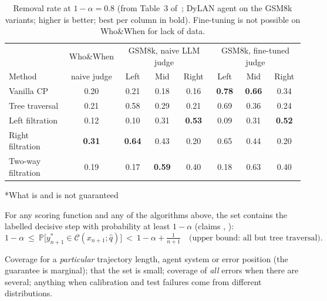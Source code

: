 \documentclass[11pt]{article}
\makeatletter
\theoremstyle{definition}
\renewcommand\subsection{\@startsection{subsection}{2}{\z@}{-3.25ex\@plus -1ex \@minus -.2ex}{1.5ex \@plus .2ex}{\normalfont\large\bfseries\color{secblue}}}
\newcommand{\C}{\mathcal{C}}
\newcommand{\qhat}{\hat{q}}
\newcommand{\PP}{\mathbb{P}}
\newcommand{\ystar}{y^*}
\makeatother
\begin{document}
\begin{table}[H]
\centering\small
\begin{tabular}{@{}l@{\quad}c@{\qquad}ccc@{\qquad}ccc@{}}\toprule
 & Who\&When & \multicolumn{3}{c}{GSM8k, naive LLM judge} & \multicolumn{3}{c}{GSM8k, fine-tuned judge}\\
Method & naive judge & Left & Mid & Right & Left & Mid & Right\\\midrule
Vanilla CP & 0.20 & 0.21 & 0.18 & 0.16 & \textbf{0.78} & \textbf{0.66} & 0.34\\
Tree traversal & 0.21 & 0.58 & 0.29 & 0.21 & 0.69 & 0.36 & 0.24\\
Left filtration & 0.12 & 0.10 & 0.31 & \textbf{0.53} & 0.09 & 0.31 & \textbf{0.52}\\
Right filtration & \textbf{0.31} & \textbf{0.64} & 0.43 & 0.20 & 0.65 & 0.44 & 0.20\\
Two-way filtration & 0.19 & 0.17 & \textbf{0.59} & 0.40 & 0.18 & 0.63 & 0.40\\\bottomrule
\end{tabular}
\caption{Removal rate at $1-\alpha=0.8$ (from Table~3 of~\cite{caea}; DyLAN agent on the GSM8k variants; higher is better; best per column in bold). Fine-tuning is not possible on Who\&When for lack of data.}
\label{tab:caea}
\end{table}

\subsection*{What is and is not guaranteed}
\begin{okbox}
For any scoring function and any of the algorithms above, the set contains the labelled decisive step with probability at least $1-\alpha$ (claims , ):
\[1-\alpha\ \le\ \PP\big[\ystar_{n+1}\in\C(x_{n+1};\qhat)\big]\ <\ 1-\alpha+\tfrac{1}{n+1}\quad\text{(upper bound: all but tree traversal)}.\]
\end{okbox}
\begin{nobox}
Coverage for a \emph{particular} trajectory length, agent system or error position (the guarantee is marginal); that the set is small; coverage of \emph{all} errors when there are several; anything when calibration and test failures come from different distributions.
\end{nobox}
\end{document}
